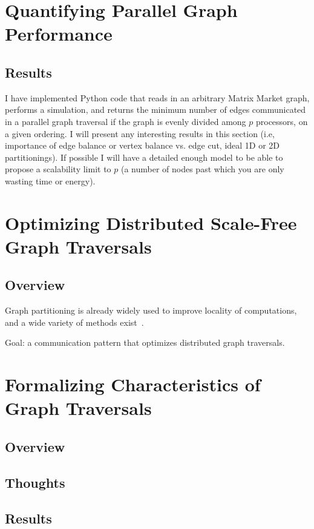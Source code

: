 \documentclass[11pt]{article}
\begin{document}
\newpage \section{Quantifying Parallel Graph Performance}
\subsection{Results}
I have implemented Python code that reads in an arbitrary Matrix Market graph, performs a simulation, and returns the minimum number of edges communicated in a parallel graph traversal if the graph is evenly divided among $p$ processors, on a given ordering. I will present any interesting results in this section (i.e, importance of edge balance or vertex balance vs. edge cut, ideal 1D or 2D partitionings). If possible I will have a detailed enough model to be able to propose a scalability limit to $p$ (a number of nodes past which you are only wasting time or energy).


\newpage \section{Optimizing Distributed Scale-Free Graph Traversals}
\subsection{Overview}
Graph partitioning is already widely used to improve locality of computations, and a wide variety of methods exist~\cite{DBLP:journals/corr/BulucMSSS13}. 

Goal: a communication pattern that optimizes distributed graph traversals.



\newpage \section{Formalizing Characteristics of Graph Traversals}
\subsection{Overview}

\subsection{Thoughts}

\subsection{Results}
\end{document}
